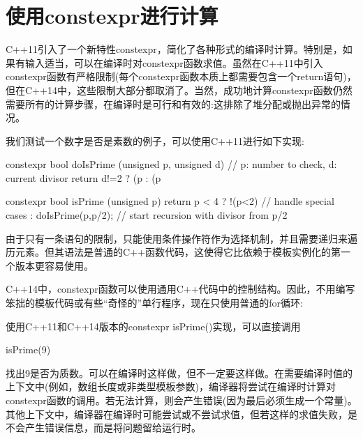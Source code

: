 \section{使用constexpr进行计算}
C++11引入了一个新特性constexpr，简化了各种形式的编译时计算。特别是，如果有输入适当，可以在编译时对constexpr函数求值。虽然在C++11中引入constexpr函数有严格限制(每个constexpr函数本质上都需要包含一个return语句)，但在C++14中，这些限制大部分都取消了。当然，成功地计算constexpr函数仍然需要所有的计算步骤，在编译时是可行和有效的:这排除了堆分配或抛出异常的情况。

我们测试一个数字是否是素数的例子，可以使用C++11进行如下实现:

\begin{cpp}
constexpr bool
doIsPrime (unsigned p, unsigned d) // p: number to check, d: current divisor
{
	return d!=2 ? (p%
	: (p%
}

constexpr bool isPrime (unsigned p)
{
	return p < 4 ? !(p<2) // handle special cases
	: doIsPrime(p,p/2); // start recursion with divisor from p/2
}
\end{cpp}

由于只有一条语句的限制，只能使用条件操作符作为选择机制，并且需要递归来遍历元素。但其语法是普通的C++函数代码，这使得它比依赖于模板实例化的第一个版本更容易使用。

C++14中，constexpr函数可以使用通用C++代码中的控制结构。因此，不用编写笨拙的模板代码或有些“奇怪的”单行程序，现在只使用普通的for循环:


使用C++11和C++14版本的constexpr isPrime()实现，可以直接调用

\begin{cpp}
isPrime(9)
\end{cpp}

找出9是否为质数。可以在编译时这样做，但不一定要这样做。在需要编译时值的上下文中(例如，数组长度或非类型模板参数)，编译器将尝试在编译时计算对constexpr函数的调用。若无法计算，则会产生错误(因为最后必须生成一个常量)。其他上下文中，编译器在编译时可能尝试或不尝试求值，但若这样的求值失败，是不会产生错误信息，而是将问题留给运行时。

